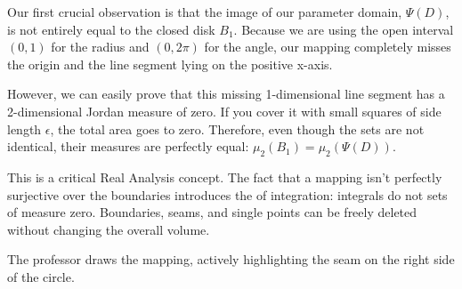 \begin{spoken-clean}[00:18:37 - 00:20:17]
Our first crucial observation is that the image of our parameter domain, $\Psi(D)$, is not entirely equal to the closed disk $B_1$. Because we are using the open interval $(0,1)$ for the radius and $(0, 2\pi)$ for the angle, our mapping completely misses the origin and the line segment lying on the positive x-axis. 

However, we can easily prove that this missing 1-dimensional line segment has a 2-dimensional Jordan measure of zero. If you cover it with small squares of side length $\epsilon$, the total area goes to zero. Therefore, even though the sets are not identical, their measures are perfectly equal: $\mu_2(B_1) = \mu_2(\Psi(D))$.
\end{spoken-clean}

\begin{didactic-insight}
This is a critical Real Analysis concept. The fact that a mapping isn't perfectly surjective over the boundaries introduces the  of integration: integrals do not  sets of measure zero. Boundaries, seams, and single points can be freely deleted without changing the overall volume.
\end{didactic-insight}

\begin{nice-box}
The professor draws the mapping, actively highlighting the  seam on the right side of the circle.
\end{nice-box}

\begin{math-stroke}
\begin{center}
\end{center}
\end{math-stroke}


